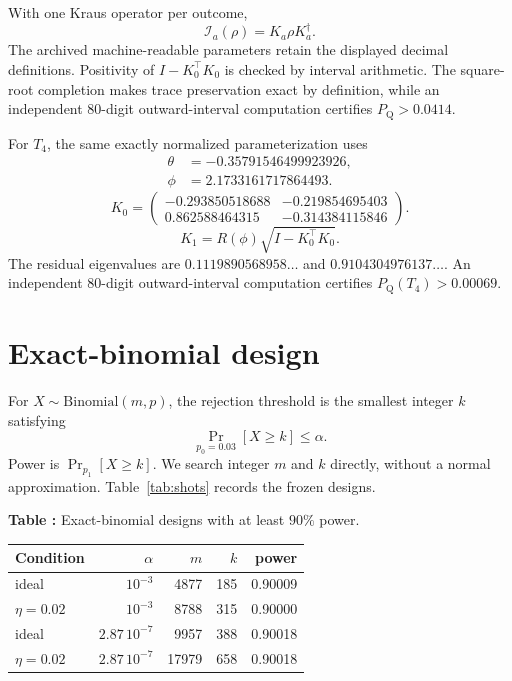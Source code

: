 \documentclass[a4paper,twocolumn,11pt,unpublished]{quantumarticle}
\begin{document}
With one Kraus operator per outcome,
\[
\mathcal I_a(\rho)=K_a\rho K_a^\dagger.
\]
The archived machine-readable parameters retain the displayed decimal
definitions.  Positivity of $I-K_0^\top K_0$ is checked by interval
arithmetic.  The square-root completion makes trace preservation exact by
definition, while an independent 80-digit outward-interval computation
certifies $P_{\mathrm Q}>0.0414$.

For $T_4$, the same exactly normalized parameterization uses
\begin{align*}
\theta&=-0.35791546499923926,\\
\phi&=2.1733161717864493.
\end{align*}
\[
K_0=
\begin{pmatrix}
-0.293850518688&-0.219854695403\\
 0.862588464315&-0.314384115846
\end{pmatrix}.
\]
\[
K_1=R(\phi)\sqrt{I-K_0^\top K_0}.
\]
The residual eigenvalues are
$0.1119890568958\ldots$ and $0.9104304976137\ldots$.
An independent 80-digit outward-interval computation certifies
$P_{\mathrm Q}(T_4)>0.00069$.

\section{Exact-binomial design}

For $X\sim\mathrm{Binomial}(m,p)$, the rejection threshold is the smallest
integer $k$ satisfying
\[
\Pr_{p_0=0.03}[X\geq k]\leq\alpha.
\]
Power is $\Pr_{p_1}[X\geq k]$.  We search integer $m$ and $k$ directly,
without a normal approximation.  Table~\ref{tab:shots} records the frozen
designs.

\begin{center}
\label{tab:shots}
\textbf{Table \thetable:} Exact-binomial designs with at least $90\%$ power.
\par\smallskip
\begin{tabular}{lrrrr}
\toprule
Condition & $\alpha$ & $m$ & $k$ & power\\
\midrule
ideal & $10^{-3}$ & 4877 & 185 & 0.90009\\
$\eta=0.02$ & $10^{-3}$ & 8788 & 315 & 0.90000\\
ideal & $2.87\,10^{-7}$ & 9957 & 388 & 0.90018\\
$\eta=0.02$ & $2.87\,10^{-7}$ & 17979 & 658 & 0.90018\\
\bottomrule
\end{tabular}
\end{center}
\end{document}
